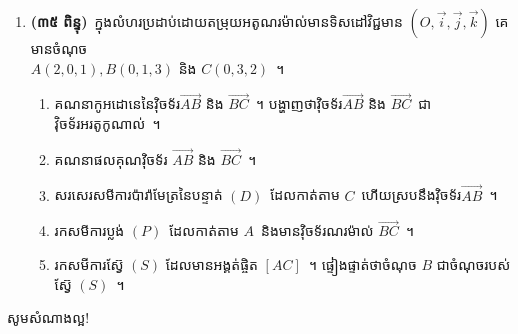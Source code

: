 \documentclass[12pt, a4paper]{article}
\begin{document}
\begin{enumerate}
\begin{enumerate}[m]
	\end{enumerate}
	\item\textbf{(៣៥ ពិន្ទុ)}~ក្នុងលំហរប្រដាប់ដោយតម្រុយអតូណរម៉ាល់មានទិសដៅវិជ្ជមាន $ (O,\vec{i},\vec{j},\vec{k}) $ គេមានចំណុច​\\
	$ A(2,0,1),B(0,1,3) $ និង $ C(0,3,2) $~។
		\begin{enumerate}[m]
			\item គណនាកូអដោនេនៃវ៉ិចទ័រ$\overrightarrow{AB}$ និង $\overrightarrow{BC}$~។ បង្ហាញថាវ៉ិចទ័រ$\overrightarrow{AB}$ និង $\overrightarrow{BC}$~ជាវ៉ិចទ័រអរតូកូណាល់~។
			\item គណនាផលគុណវ៉ិចទ័រ $\overrightarrow{AB}$ និង $\overrightarrow{BC}$~។
			\item សរសេរសមីការប៉ារ៉ាមែត្រនៃបន្ទាត់ $(D)$~ដែលកាត់តាម $C$~ហើយស្របនឹងវ៉ិចទ័រ$\overrightarrow{AB}$~។
			\item រកសមីការប្លង់ $(P)$~ដែលកាត់តាម $A$~និងមានវ៉ិចទ័រណរម៉ាល់ $\overrightarrow{BC}$~។
			\item រកសមីការស្វ៊ែ $(S)$ ដែលមានអង្គត់ផ្ចិត $[AC]$~។ ផ្ទៀងផ្ទាត់ថាចំណុច $B$ ជាចំណុចរបស់ស្វ៊ែ $(S)$~។
		\end{enumerate}
	\end{enumerate}
	\begin{center}
		\sffamily\color{black}
		សូមសំណាងល្អ!
	\end{center}\newpage
\end{document}
